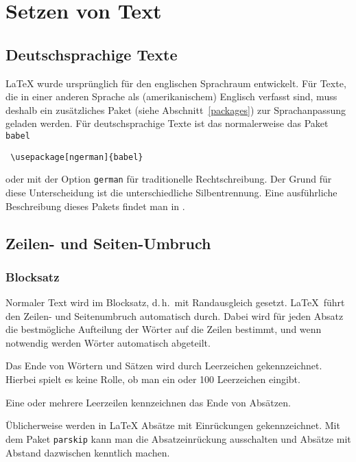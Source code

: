  
\section{Setzen von Text}
 

\subsection{Deutschsprachige Texte}\label{deutsch}
\LaTeX{} wurde ursprünglich für den englischen Sprachraum entwickelt.
Für Texte, die in einer anderen Sprache als (amerikanischem)
Englisch verfasst sind, muss deshalb ein zusätzliches Paket 
(siehe Abschnitt~\ref{packages}) zur Sprachanpassung geladen werden.  
Für deutschsprachige Texte ist das normalerweise das Paket \texttt{babel} 
\begin{lstlisting}
 \usepackage[ngerman]{babel}
\end{lstlisting}
oder mit der Option \texttt{german} für traditionelle Rechtschreibung.
Der Grund für diese Unterscheidung ist die unterschiedliche Silbentrennung.
Eine ausführliche Beschreibung dieses Pakets findet man in \cite{babel}.



\subsection{Zeilen- und Seiten-Umbruch}

\subsubsection{Blocksatz}

Normaler Text wird im Blocksatz, d.\,h.~mit Randausgleich
gesetzt.  \LaTeX\ führt den Zeilen- und Seitenumbruch
automatisch durch.  Dabei wird für jeden Absatz die
bestmögliche Aufteilung der Wörter auf die Zeilen bestimmt,
und wenn notwendig werden Wörter automatisch abgeteilt.
\begin{LTXexample}
Das Ende von Wörtern und
Sätzen wird durch Leerzeichen 
gekennzeichnet.
Hierbei spielt es keine Rolle,
ob man ein  oder           100
Leerzeichen eingibt.
 
Eine oder mehrere Leerzeilen
kennzeichnen das Ende von
Absätzen.
\end{LTXexample}

Üblicherweise werden in \LaTeX{} Absätze mit Einrückungen gekennzeichnet. Mit
dem Paket \texttt{parskip} kann man die Absatzeinrückung ausschalten und
Absätze mit Abstand dazwischen kenntlich machen.

